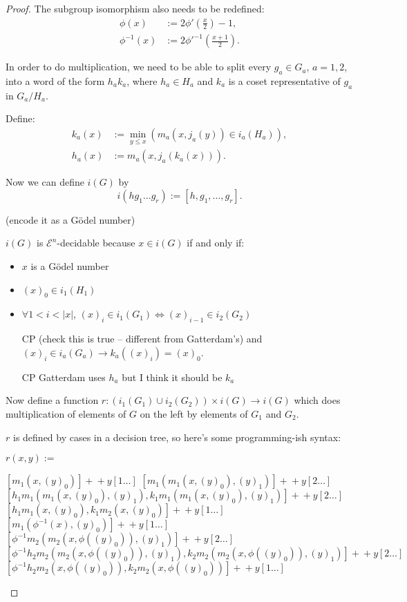 \documentclass[a4paper]{article}
\newcommand{\grz}[1]{$\mathcal{E}^{#1}$}	%
\theoremstyle{plain}
\theoremstyle{definition}
\newenvironment{cpe}{\noindent\color{OliveGreen} CP }{}
\newcommand{\cp}[1]{
\begin{cpe} #1 \end{cpe}}
\begin{document}
\begin{proof}
The subgroup isomorphism also needs to be redefined:
\begin{align*}
	\phi(x) &:= 2\phi' \left( \frac{x}{2} \right)-1, \\
	\phi^{-1}(x) &:= 2 \phi'^{-1} \left( \frac{x+1}{2} \right). 
\end{align*}

In order to do multiplication, we need to be able to split every $g_a \in G_a$, $a=1,2$, into a word of the form $h_ak_a$, where $h_a \in H_a$ and $k_a$ is a coset representative of $g_a$ in $G_a / H_a$.

Define:
\begin{align*}
	k_a(x) &:= \min_{y \leq x} \left( m_a(x,j_a(y)) \in i_a(H_a) \right), \\
	h_a(x) &:= m_a(x,j_a(k_a(x))). 
\end{align*}

Now we can define $i(G)$ by
\[ i(hg_1 \dots g_r) := [h,g_1,\dots,g_r]. \]

(encode it as a G\"odel number)

$i(G)$ is \grz{n}-decidable because $x \in i(G)$ if and only if:
\begin{itemize}
	\item $x$ is a G\"odel number
	\item $(x)_0 \in i_1(H_1)$
	\item $\forall 1 < i < |x|$, $(x)_i \in i_1(G_1) \Leftrightarrow (x)_{i-1} \in i_2(G_2)$
				\cp{(check this is true -- different from Gatterdam's)} 
				and $(x)_i \in i_a(G_a) \rightarrow k_a((x)_i) = (x)_0$.
				\cp{Gatterdam uses $h_a$ but I think it should be $k_a$}
\end{itemize}

Now define a function $r: (i_1(G_1) \cup i_2(G_2)) \times i(G) \to i(G)$ which does multiplication of elements of $G$ on the left by elements of $G_1$ and $G_2$.

$r$ is defined by cases in a decision tree, so here's some programming-ish syntax:

$r(x,y):=$
\begin{algorithmic}
		\State $[m_1(x,(y)_0)] +\!\!\!\!+ y[1 \dots]$
	\Else
				\State $[m_1(m_1(x,(y)_0),(y)_1)] +\!\!\!\!+ y[2 \dots]$
			\Else
				\State $[h_1m_1(m_1(x,(y)_0),(y)_1), k_1m_1(m_1(x,(y)_0),(y)_1)] +\!\!\!\!+ y[2 \dots]$
			\EndIf
		\Else
			\State $[h_1m_1(x,(y)_0),k_1m_2(x,(y)_0)] +\!\!\!\!+ y[1 \dots]$
		\EndIf
	\EndIf
\Else
		\State $[m_1(\phi^{-1}(x),(y)_0)] +\!\!\!\!+ y[1 \dots]$
	\Else
				\State $[\phi^{-1}m_2(m_2(x,\phi((y)_0)),(y)_1)] +\!\!\!\!+ y[2 \dots]$
			\Else
				\State $[\phi^{-1}h_2m_2(m_2(x,\phi((y)_0)),(y)_1), k_2m_2(m_2(x,\phi((y)_0)),(y)_1)] +\!\!\!\!+ y[2 \dots]$
			\EndIf
		\Else
			\State $[\phi^{-1}h_2m_2(x,\phi((y)_0)),k_2m_2(x,\phi((y)_0))] +\!\!\!\!+ y[1 \dots]$
		\EndIf
	\EndIf
\EndIf
\end{algorithmic}


\end{proof}
\end{document}
